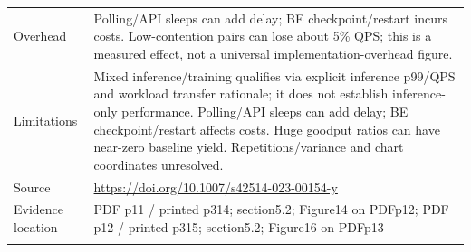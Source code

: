 \begin{longtable}{>{\raggedright\arraybackslash}p{}>{\raggedright\arraybackslash}p{}}
Overhead & Polling/API sleeps can add delay; BE checkpoint/restart incurs costs. Low-contention pairs can lose about 5\% QPS; this is a measured effect, not a universal implementation-overhead figure.\\\addlinespace
Limitations & Mixed inference/training qualifies via explicit inference p99/QPS and workload transfer rationale; it does not establish inference-only performance. Polling/API sleeps can add delay; BE checkpoint/restart affects costs. Huge goodput ratios can have near-zero baseline yield. Repetitions/variance and chart coordinates unresolved.\\\addlinespace
Source & \url{https://doi.org/10.1007/s42514-023-00154-y}\\\addlinespace
Evidence location & PDF p11 / printed p314; section5.2; Figure14 on PDFp12; PDF p12 / printed p315; section5.2; Figure16 on PDFp13\\\addlinespace
\bottomrule\end{longtable}


